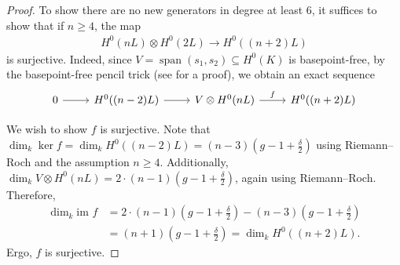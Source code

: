 \documentclass{amsart}
\theoremstyle{plain}
\theoremstyle{definition}
\theoremstyle{remark}
\newtheorem{rem}[thm]{Remark}
\numberwithin{equation}{section}
\newcommand\im{\text{im }}
\DeclareMathOperator{\newspan}{span}
\begin{document}

\begin{proof}
To show there are no new generators in degree at least $6$, it
suffices to show that if $n \geq 4$, the map
\begin{align*}
	H^0(nL) \otimes H^0(2L) \rightarrow H^0((n+2)L)
\end{align*}
is surjective. Indeed, since $V = \newspan(s_1, s_2) \subseteq
H^0(K)$ is basepoint-free, by the basepoint-free pencil trick (see
\cite[Lemma 2.6]{saint-donat:proj} for a proof), we obtain an exact
sequence
$$\begin{tikzcd}
0 \ar r & H^0((n-2)L) \ar r & V \otimes H^0(nL) \ar{r}{f} & H^0((n+2)L)
\end{tikzcd}$$

We wish to show $f$ is surjective.
Note that $\dim_k \ker f = \dim_k H^0((n - 2)L) = (n - 3)(g - 1+\frac{\delta}{2})$ using Riemann--Roch and the assumption $n \geq 4.$
Additionally, $\dim_k V \otimes H^0(nL) = 2 \cdot (n - 1)(g - 1+\frac{\delta}{2})$, again using Riemann--Roch.
Therefore,
\begin{align*}
	\dim_k \im f 	& = 2 \cdot (n - 1)(g - 1+ \frac{\delta}{2}) - (n - 3)(g - 1 + \frac{\delta}{2})\\
				& = (n + 1)(g - 1 + \frac{\delta}{2}) = \dim_k H^0((n + 2)L).
\end{align*}
Ergo, $f$ is surjective.
\end{proof}
\end{document}
